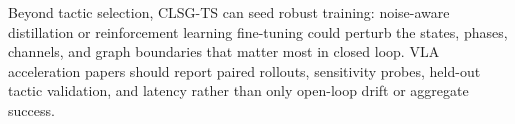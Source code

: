 \documentclass[letterpaper,10pt,twocolumn]{article}
\begin{document}
Beyond tactic selection, CLSG-TS can seed robust training: noise-aware distillation or reinforcement learning fine-tuning could perturb the states, phases, channels, and graph boundaries that matter most in closed loop. VLA acceleration papers should report paired rollouts, sensitivity probes, held-out tactic validation, and latency rather than only open-loop drift or aggregate success.



\end{document}
